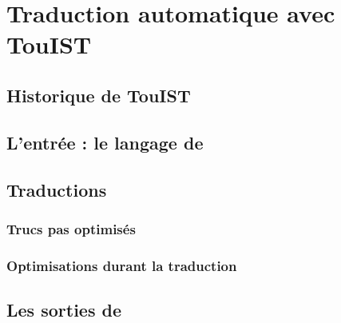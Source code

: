 \documentclass[a4paper,12pt,oneside,fullcap,chkrefs,webpdf64,m3L,cmr,mathcenter,noSciVerse,amsmath]{extbook}
\begin{document}
\chapter{Traduction automatique avec TouIST}

\section{Historique de TouIST}




\section{L'entrée : le langage de \touist}





\section{Traductions}
\subsection{Trucs pas optimisés}
\subsection{Optimisations durant la traduction}
\section{Les sorties de \touist}




\end{document}
